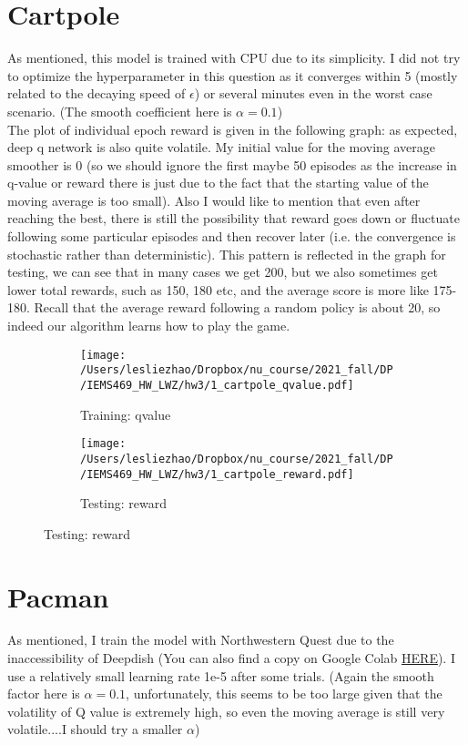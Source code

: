 \documentclass[12pt,letterpaper]{article}
\begin{document}
\section{Cartpole}
As mentioned, this model is trained with CPU due to its simplicity. I did not try to optimize the hyperparameter in this question as it converges within 5 (mostly related to the decaying speed of $\epsilon$) or several minutes even in the worst case scenario. (The smooth coefficient here is $\alpha=0.1$)\\

The plot of individual epoch reward is given in the following graph: as expected, deep q network is also quite volatile. My initial value for the moving average smoother is 0 (so we should ignore the first maybe 50 episodes as the increase in q-value or reward there is just due to the fact that the starting value of the moving average is too small). Also I would like to mention that even after reaching the best, there is still the possibility that reward goes down or fluctuate following some particular episodes and then recover later (i.e. the convergence is stochastic rather than deterministic). This pattern is reflected in the graph for testing, we can see that in many cases we get 200, but we also sometimes get lower total rewards, such as 150, 180 etc, and the average score is more like 175-180. Recall that the average reward following a random policy is about 20, so indeed our algorithm learns how to play the game.




 \begin{figure}[H]
 	\centering
 	\caption{Cartpole game}
 	\begin{subfigure}[h]{0.9\textwidth}
 		\centering
 		\texttt{[image: /Users/lesliezhao/Dropbox/nu\_course/2021\_fall/DP/IEMS469\_HW\_LWZ/hw3/1\_cartpole\_qvalue.pdf]}
 		\caption{Training: qvalue}
 	\end{subfigure}
  	\begin{subfigure}[h]{0.9\textwidth}
 	\centering
 	\texttt{[image: /Users/lesliezhao/Dropbox/nu\_course/2021\_fall/DP/IEMS469\_HW\_LWZ/hw3/1\_cartpole\_reward.pdf]}
 	\caption{Testing: reward}
 \end{subfigure}
 \end{figure}


\section{Pacman}
As mentioned, I train the model with Northwestern Quest due to the inaccessibility of Deepdish (You can also find a copy on Google Colab \href{https://colab.research.google.com/drive/1990i7SjLFgfk_CTRvJBCWppqFl8RlDNg?usp=sharing}{HERE}). I use a relatively small learning rate 1e-5 after some trials. (Again the smooth factor here is $\alpha=0.1$, unfortunately, this seems to be too large given that the volatility of Q value is extremely high, so even the moving average is still very volatile....I should try a smaller $\alpha$)\\
\end{document}
